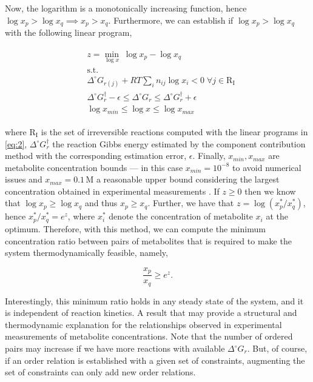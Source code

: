 \documentclass[12pt]{article}
\begin{document}
  Now, the logarithm is a monotonically increasing function, hence $\log{x_p} > \log{x_q} \implies x_p > x_q$. Furthermore, we can establish if $\log{x_p} > \log{x_q}$ with the following linear program,

  \begin{align}
    \begin{aligned}
      \label{eq:5}
      &z = \min_{\log{x}} \; \log{x_p} - \log{x_q}
      \\
      &\mathrm{s.t.}
      \\
      &\Delta^{\circ} G_{r(j)} + RT \sum_i n_{ij} \log{x_i} < 0 \; \forall j \in \mathrm{R_I}
      \\
      &\Delta^{\circ} G_{r}^{\dagger} - \epsilon \leq \Delta^{\circ} G_{r} \leq \Delta^{\circ} G_{r}^{\dagger} + \epsilon
      \\
      &\log{x}_{min} \leq \log{x} \leq \log{x}_{max}
    \end{aligned}
  \end{align}

  \noindent where $\mathrm{R_I}$ is the set of irreversible reactions computed with the linear programs in \ref{eq:2}, $\Delta^{\circ} G_{r}^{\dagger}$ the reaction Gibbs energy estimated by the component contribution method with the corresponding estimation error, $\epsilon$. Finally, $x_{min}, x_{max}$ are metabolite concentration bounds --- in this case $x_{min} = 10^{-8}$ to avoid numerical issues and $x_{max} = 0.1 \,\mathrm{M}$ a reasonable upper bound considering the largest concentration obtained in experimental measurements \cite{Bennett2008}. If $z \geq 0$ then we know that $\log{x_p} \geq \log{x_q}$ and thus $x_p \geq x_q$. Further, we have that $z = \log{(x_p^*/x_q^*)}$, hence $x_p^*/x_q^* = e^z$, where $x_i^*$ denote the concentration of metabolite $x_i$ at the optimum. Therefore, with this method, we can compute the minimum concentration ratio between pairs of metabolites that is required to make the system thermodynamically feasible, namely,

  \begin{equation}
    \label{eq:6}
    \frac{x_p}{x_q} \geq e^z.
  \end{equation}

  Interestingly, this minimum ratio holds in any steady state of the system, and it is independent of reaction kinetics. A result that may provide a structural and thermodynamic explanation for the relationships observed in experimental measurements of metabolite concentrations. Note that the number of ordered pairs may increase if we have more reactions with available $\Delta^{\circ} G_{r}$. But, of course, if an order relation is established with a given set of constraints, augmenting the set of constraints can only add new order relations.
\end{document}
